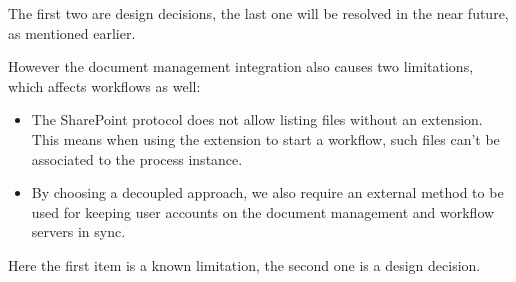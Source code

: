 The first two are design decisions, the last one will be resolved in the near
future, as mentioned earlier.

However the document management integration also causes two limitations, which affects workflows as well:

\begin{itemize}
\item The SharePoint protocol does not allow listing files without an
extension. This means when using the extension to start a workflow, such files
can't be associated to the process instance.
\item By choosing a decoupled approach, we also require an external method to
be used for keeping user accounts on the document management and workflow
servers in sync.
\end{itemize}

Here the first item is a known limitation, the second one is a design decision.
